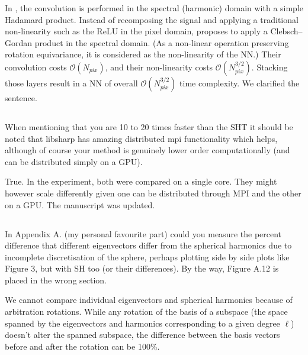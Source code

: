 \documentclass[12pt,a4paper]{article}
\newcommand{\1}{\b{1}}              %
\newcommand{\0}{\b{0}}              %
\begin{document}
In \cite{kondor2018clebsch}, the convolution is performed in the spectral (harmonic) domain with a simple Hadamard product.
Instead of recomposing the signal and applying a traditional non-linearity such as the ReLU in the pixel domain, \cite{kondor2018clebsch} proposes to apply a Clebsch–Gordan product in the spectral domain.
(As a non-linear operation preserving rotation equivariance, it is considered as the non-linearity of the NN.)
Their convolution costs $\mathcal{O}(N_{pix})$, and their non-linearity costs $\mathcal{O}(N^{3/2}_{pix})$.
Stacking those layers result in a NN of overall $\mathcal{O}(N^{3/2}_{pix})$ time complexity.
We clarified the sentence.

\subsection{}
\begin{mdframed}[style=comment]
When mentioning that you are 10 to 20 times faster than the SHT it should be noted that libsharp has amazing distributed mpi functionality which helps, although of course your method is genuinely lower order computationally (and can be distributed simply on a GPU).
\end{mdframed}

True.
In the experiment, both were compared on a single core.
They might however scale differently given one can be distributed through MPI and the other on a GPU.
The manuscript was updated.

\subsection{}
\begin{mdframed}[style=comment]
In Appendix A. (my personal favourite part) could you measure the percent difference that different eigenvectors differ from the spherical harmonics due to incomplete discretisation of the sphere, perhaps plotting side by side plots like Figure 3, but with SH too (or their differences). By the way, Figure A.12 is placed in the wrong section.
\end{mdframed}

We cannot compare individual eigenvectors and spherical harmonics because of arbitration rotations.
While any rotation of the basis of a subspace (the space spanned by the eigenvectors and harmonics corresponding to a given degree $\ell$) doesn't alter the spanned subspace, the difference between the basis vectors before and after the rotation can be 100\%.
\end{document}
